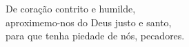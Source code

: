 De coração contrito e humilde, \\ aproximemo-nos do Deus justo e santo, \\ para que tenha piedade de nós, pecadores.
\vspace{.2cm}\\
